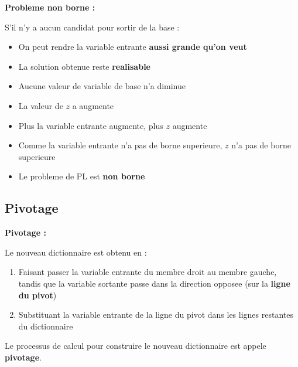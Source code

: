 \documentclass[12pt,a4paper]{article}
\begin{document}
\begin{important}
\textbf{Probleme non borne :}

S'il n'y a aucun candidat pour sortir de la base :
\begin{itemize}
    \item On peut rendre la variable entrante \textcolor{titrebleu}{\textbf{aussi grande qu'on veut}}
    \item La solution obtenue reste \textcolor{defvert}{\textbf{realisable}}
    \item Aucune valeur de variable de base n'a diminue
    \item La valeur de $z$ a augmente
    \item Plus la variable entrante augmente, plus $z$ augmente
    \item Comme la variable entrante n'a pas de borne superieure, $z$ n'a pas de borne superieure
    \item Le probleme de PL est \textcolor{importantrouge}{\textbf{non borne}}
\end{itemize}
\end{important}

\newpage
\subsection{Pivotage}

\begin{definition}
\textbf{Pivotage :}

Le nouveau dictionnaire est obtenu en :
\begin{enumerate}
    \item Faisant passer la variable entrante du membre droit au membre gauche, tandis que la variable sortante passe dans la direction opposee (sur la \textcolor{algoviolet}{\textbf{ligne du pivot}})
    
    \item Substituant la variable entrante de la ligne du pivot dans les lignes restantes du dictionnaire
\end{enumerate}

Le processus de calcul pour construire le nouveau dictionnaire est appele \textcolor{algoviolet}{\textbf{pivotage}}.
\end{definition}
\end{document}
